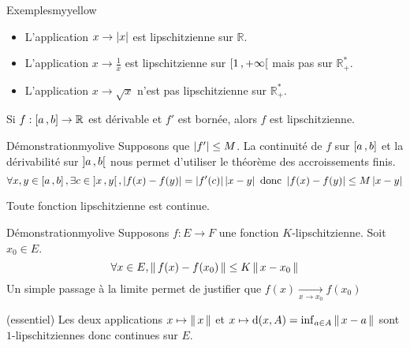    \begin{omed}{Exemples}{myyellow}
        \begin{itemize}
            \item L’application $x \rightarrow \left\lvert x\right\rvert$ est lipschitzienne sur $\mathbb{R}$.
            \item L’application $x \rightarrow \frac{1}{x}$ est lipschitzienne sur $\left[ 1 \, , +\infty \right[$ mais pas sur $\mathbb{R}_+^*$.
            \item L’application $x \rightarrow \sqrt{x}$ n’est pas lipschitzienne sur $\mathbb{R}_+^*$.
        \end{itemize}
    \end{omed}

    \begin{prop}{}{}
        Si $f : \left[ a \, , b \right] \rightarrow \mathbb{R}$ est dérivable et $f'$ est bornée, alors $f$ est lipschitzienne.
    \end{prop}

    \begin{demo}{Démonstration}{myolive}
        Supposons que $\left\lvert f'\right\rvert \leq M$. La continuité de $f$ sur $\left[ a \, , b \right]$ et la dérivabilité sur $\left] a \, , b \right[$  nous permet d’utiliser le théorème des accroissements finis.
        \[ \forall x,y \in \left[ a \, , b \right], \exists c \in \left] x \, , y \right[, \left\lvert f(x)-f(y)\right\rvert = \left\lvert f'(c)\right\rvert\left\lvert x-y\right\rvert \text{ donc } \left\lvert f(x) - f(y)\right\rvert \leq M \left\lvert x-y\right\rvert \] 
    \end{demo}

    \begin{prop}{}{}
        Toute fonction lipschitzienne est continue.
    \end{prop}

    \begin{demo}{Démonstration}{myolive}
        Supposons $f : E \rightarrow F$ une fonction $K$-lipschitzienne. Soit $x_0 \in E$.
        \[ \forall x \in E, \left\lVert\,f(x)-f(x_0)\,\right\rVert \leq K \left\lVert\,x - x_0\,\right\rVert \] 
        Un simple passage à la limite permet de justifier que $f(x) \underset{x \rightarrow x_0}{\longrightarrow} f(x_0)$
    \end{demo}

    \begin{coro}{(essentiel)}{}
        Les deux applications $x \mapsto \left\lVert\,x\,\right\rVert$ et $x \mapsto \operatorname{d}(x,A) = \inf_{a \in A} \left\lVert\,x-a\,\right\rVert$ sont $1$-lipschitziennes donc continues sur $E$.
    \end{coro}


